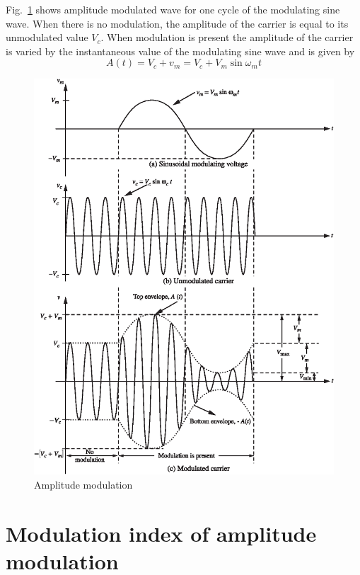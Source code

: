 Fig.~\ref{fig9.2} shows amplitude modulated wave for one cycle of the modulating sine wave. When there is no modulation, the amplitude of the carrier is equal to its unmodulated value $V_{c}$. When modulation is present the amplitude of the carrier is varied by the instantaneous value of the modulating sine wave and is given by
\begin{equation}
A(t)=V_{c}+v_{m}=V_{c}+V_{m}\sin \omega_{m}t\label{eq9.8}
\end{equation}
\begin{figure}[H]
\centering
\includegraphics[scale=1.05]{chap9/S3-EE-07-003.eps}
\caption{Amplitude modulation}\label{fig9.2}
\end{figure}

\section{Modulation index of amplitude modulation}\label{sec9.8}

